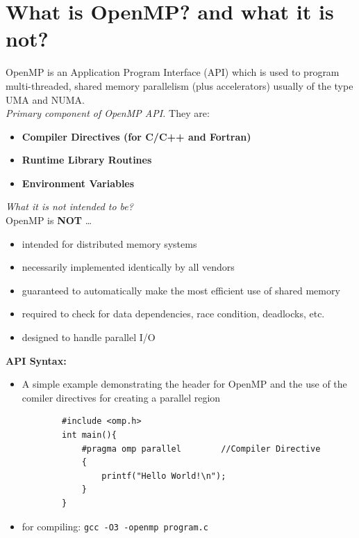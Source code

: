 \documentclass[12pt, a4paper]{report}
\begin{document}
 \section{What is OpenMP? {\small{and what it is not?}}}
 OpenMP is an Application Program Interface (API) which is used to program multi-threaded, shared memory parallelism (plus accelerators)
 usually of the type UMA and NUMA.\\
 {\textit{Primary component of OpenMP API.}} They are:
 \begin{itemize}
     \item {\bfseries{Compiler Directives (for C/C++ and Fortran)}}
     \item {\bfseries{Runtime Library Routines}}
     \item {\bfseries{Environment Variables}}
 \end{itemize}

 {\textit{What it is not intended to be?}}\\
 OpenMP is {\bfseries{NOT}} \dots 
 \begin{itemize}
     \item intended for distributed memory systems
     \item necessarily implemented identically by all vendors
     \item guaranteed to automatically make the most efficient use of shared memory
     \item required to check for data dependencies, race condition, deadlocks, etc.
     \item designed to handle parallel I/O
 \end{itemize}

{\bfseries{API Syntax:}}
\begin{itemize}
    \item A simple example demonstrating the header for OpenMP and the use of the comiler directives for creating a parallel region
    \begin{verbatim}
        #include <omp.h>
        int main(){
            #pragma omp parallel        //Compiler Directive
            {
                printf("Hello World!\n");
            }
        }
    \end{verbatim}
    \item for compiling: {\texttt{gcc -O3 -openmp program.c}}
\end{itemize}
\end{document}
